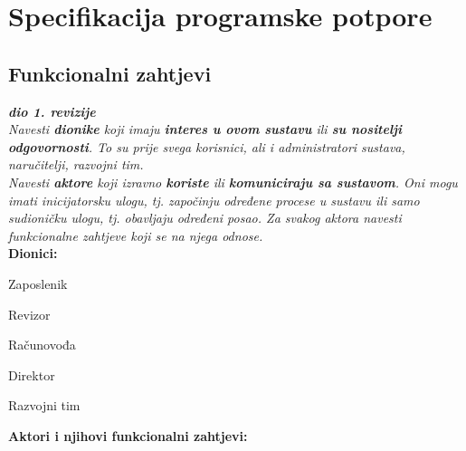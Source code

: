 \chapter{Specifikacija programske potpore}
		
	\section{Funkcionalni zahtjevi}
			
			\textbf{\textit{dio 1. revizije}}\\
			
			\textit{Navesti \textbf{dionike} koji imaju \textbf{interes u ovom sustavu} ili  \textbf{su nositelji odgovornosti}. To su prije svega korisnici, ali i administratori sustava, naručitelji, razvojni tim.}\\
				
			\textit{Navesti \textbf{aktore} koji izravno \textbf{koriste} ili \textbf{komuniciraju sa sustavom}. Oni mogu imati inicijatorsku ulogu, tj. započinju određene procese u sustavu ili samo sudioničku ulogu, tj. obavljaju određeni posao. Za svakog aktora navesti funkcionalne zahtjeve koji se na njega odnose.}\\
			
			
			\noindent \textbf{Dionici:}
			
			\begin{packed_enum}
				
				\item Zaposlenik
				\item Revizor
				\item Računovođa
				\item Direktor
				\item Razvojni tim
				
			\end{packed_enum}
			

			\noindent \textbf{Aktori i njihovi funkcionalni zahtjevi:}
			
